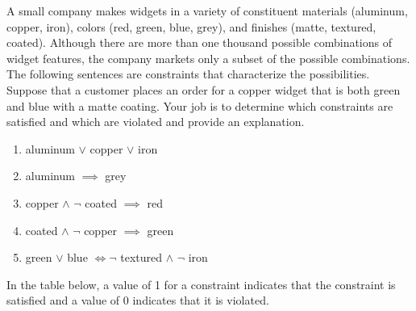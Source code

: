 \documentclass[addpoints]{exam}
\begin{document}
\begin{questions}

\question[5] A small company makes widgets in a variety of constituent materials (aluminum, copper, iron), colors (red, green, blue, grey), and finishes (matte, textured, coated). Although there are more than one thousand possible combinations of widget features, the company markets only a subset of the possible combinations. The following sentences are constraints that characterize the possibilities. Suppose that a customer places an order for a copper widget that is both green and blue with a matte coating. Your job is to determine which constraints are satisfied and which are violated and provide an explanation.
  \begin{enumerate}
  \item aluminum $\lor$ copper $\lor$ iron
  \item aluminum $\implies$ grey
  \item copper $\land$ $\neg$ coated $\implies$ red
  \item coated $\land$ $\neg$ copper $\implies$ green
  \item green $\lor$ blue $\iff \neg$ textured $\land$ $\neg$ iron
  \end{enumerate}
  \begin{solution} %
    In the table below, a value of 1 for a constraint indicates that the constraint is satisfied and a value of 0 indicates that it is violated.


\end{solution}
\end{questions}
\end{document}
